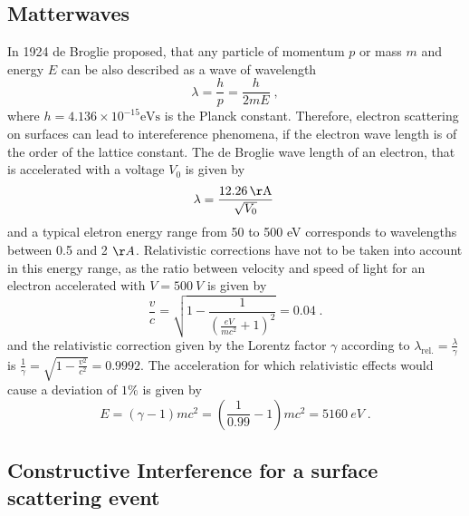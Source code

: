 \documentclass[a4paper]{scrartcl}
\numberwithin{equation}{section}
\numberwithin{figure}{section}
\numberwithin{table}{section}
\newcommand{\eq}[2]{\begin{equation}#1\label{#2}\end{equation}}
\begin{document}
\subsection{Matterwaves}
In 1924 de Broglie proposed, that any particle of momentum $p$ or mass $m$ and energy $E$ can be also described as a wave of wavelength 
\eq{\lambda = \frac{h}{p} =\frac{h}{2mE} \;,}{lambda}
where $h=4.136\times 10^{-15} \text{eVs}$ is the Planck constant. Therefore, electron scattering on surfaces can lead to intereference phenomena, if the electron wave length is of the order of the lattice constant. The de Broglie wave length of an electron, that is accelerated with a voltage $V_0$ is given by 
\eq{\lambda= \frac{\SI{12.26}{\AA}}{\sqrt{V_0}} \; }{lV}
and a typical eletron energy range from 50 to 500 eV corresponds to wavelengths between 0.5 and 2 $\AA$. Relativistic corrections have not to be taken into account in this energy range, as the ratio between velocity and speed of light for an electron accelerated with $V = \SI{500}{V}$ is given by
\eq{\frac{v}{c}=\sqrt{1-\frac{1}{(\frac{eV}{mc^2}+1)^2}} =0.04 \; .}{} 
and the relativistic correction given by the Lorentz factor $\gamma$ according to $\lambda_\text{rel.} = \frac{\lambda}{\gamma}$ is $\frac{1}{\gamma} = \sqrt{1-\frac{v^2}{c^2}}= 0.9992$. The acceleration for which relativistic effects would cause a deviation of $1\percent$ is given by
\eq{E=(\gamma -1)mc^2= \left(\frac{1}{0.99}-1\right)mc^2=\SI{5160}{eV}\;. }{}

\subsection{Constructive Interference for a surface scattering event}
\end{document}
